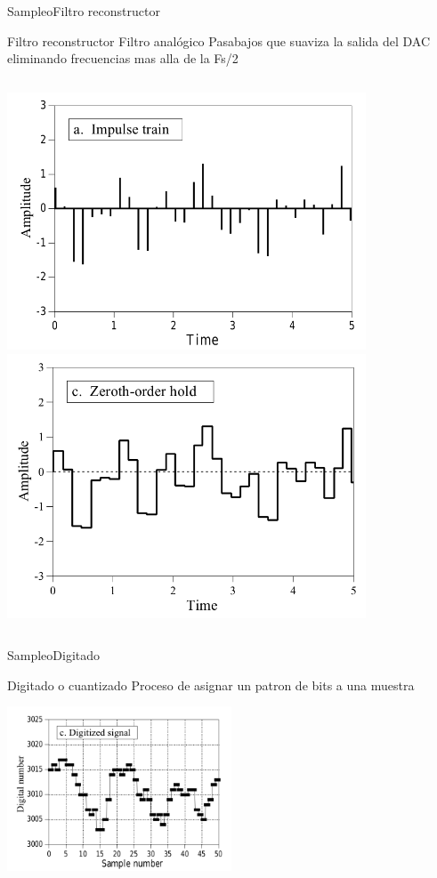  \begin{frame}{Sampleo}{Filtro reconstructor}
    \begin{block}{Filtro reconstructor}
       Filtro \alert{analógico} Pasabajos que suaviza la salida del DAC eliminando frecuencias mas alla de la Fs/2
    \end{block}
    \begin{columns}[onlytextwidth]
       \center\includegraphics[width=0.8\textwidth]{1_clase/filtro_reconstructor1}
       \center\includegraphics[width=0.8\textwidth]{1_clase/filtro_reconstructor2}
    \end{columns}
    \vfill
 \end{frame}
 \begin{frame}{Sampleo}{Digitado}
    \begin{block}{Digitado o cuantizado}
       Proceso de asignar un patron de bits a una muestra
    \end{block}
       \center\includegraphics[width=0.5\textwidth]{1_clase/digitado}
    \vfill
 \end{frame}
